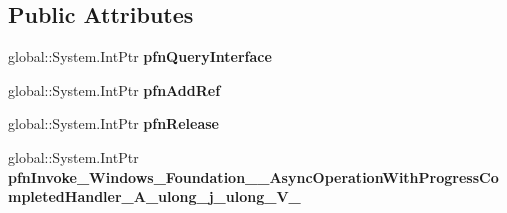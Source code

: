 \subsection*{Public Attributes}
\begin{DoxyCompactItemize}
\item 
\mbox{\label{struct_windows_1_1_foundation_1_1_async_operation_with_progress_completed_handler___a__ulong__j__ulong___v_______impl_1_1_vtbl_ab3137d2fe4456163acfc3783f1b3e935}} 
global\+::\+System.\+Int\+Ptr {\bfseries pfn\+Query\+Interface}
\item 
\mbox{\label{struct_windows_1_1_foundation_1_1_async_operation_with_progress_completed_handler___a__ulong__j__ulong___v_______impl_1_1_vtbl_a7f9a0b052735796716df57209e259bb2}} 
global\+::\+System.\+Int\+Ptr {\bfseries pfn\+Add\+Ref}
\item 
\mbox{\label{struct_windows_1_1_foundation_1_1_async_operation_with_progress_completed_handler___a__ulong__j__ulong___v_______impl_1_1_vtbl_ad2689f61c8d839d2dccad19b81fb521e}} 
global\+::\+System.\+Int\+Ptr {\bfseries pfn\+Release}
\item 
\mbox{\label{struct_windows_1_1_foundation_1_1_async_operation_with_progress_completed_handler___a__ulong__j__ulong___v_______impl_1_1_vtbl_aa12b00843c03fdf7cd8f23c19530b560}} 
global\+::\+System.\+Int\+Ptr {\bfseries pfn\+Invoke\+\_\+\+Windows\+\_\+\+Foundation\+\_\+\+\_\+\+Async\+Operation\+With\+Progress\+Completed\+Handler\+\_\+\+A\+\_\+ulong\+\_\+j\+\_\+ulong\+\_\+\+V\+\_\+}
\end{DoxyCompactItemize}
